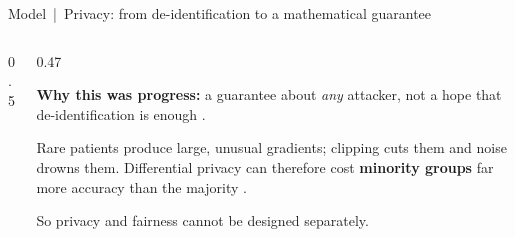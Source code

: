 \documentclass[aspectratio=169,10pt]{beamer}
\begin{document}
\begin{frame}{Model \,|\, Privacy: from de-identification to a mathematical guarantee}
\begin{columns}[T]
\begin{column}{0.5\textwidth}
\vspace{1mm}
\end{column}
\begin{column}{0.47\textwidth}
{\footnotesize\textbf{Why this was progress:} a guarantee about \emph{any} attacker, not a hope that de-identification is enough .

\vspace{2mm}
 Rare patients produce large, unusual gradients; clipping cuts them and noise drowns them. Differential privacy can therefore cost \textbf{minority groups} far more accuracy than the majority .

\vspace{2mm}
So privacy and fairness cannot be designed separately.}
\end{column}
\end{columns}
\end{frame}
\end{document}
